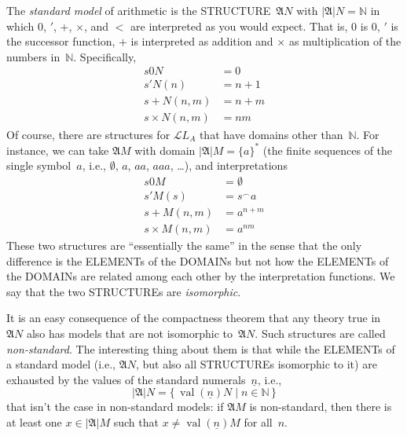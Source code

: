 \documentclass[10pt,a4paper]{article}
\newcommand*{\olup}[1]{\MakeUppercase{#1}}
\theoremstyle{plain}
\theoremstyle{definition}
\theoremstyle{remark}
\providecommand{\Obj}{}
\providecommand{\Struct}{\ensuremath{\mathfrak{A}}}
\providecommand{\Domain}{\ensuremath{|\mathfrak{A}|}}
\providecommand{\Assign}{\ensuremath{s}}
\providecommand{\Lang}{\ensuremath{\mathcal{L}}}
\providecommand{\num}[1]{\underline{#1}}
\providecommand{\Nat}{\ensuremath{\mathbb{N}}}
\providecommand{\concat}{\mathbin{{}^\frown}}
\providecommand{\Setabs}[2]{\{\, #1 \mid #2 \,\}}
\providecommand{\Value}[1]{\operatorname{val}(#1)}
\begin{document}
The \emph{standard model} of arithmetic is the
\olup{structure}~$\Struct{N}$ with $\Domain{N} = \Nat$ in which
$\Obj{0}$, $\prime$, $+$, $\times$, and $<$ are interpreted as you
would expect. That is, $\Obj{0}$ is $0$, $\prime$ is the successor
function, $+$ is interpreted as addition and $\times$ as multiplication
of the numbers in~$\Nat$. Specifically,
\begin{align*}
  \Assign{\Obj{0}}{N} & = 0\\
  \Assign{\prime}{N}(n) & = n + 1\\
  \Assign{+}{N}(n, m) & = n + m\\
  \Assign{\times}{N}(n, m) & = nm
\end{align*}
Of course, there are structures for $\Lang{L_A}$ that have domains
other than~$\Nat$. For instance, we can take $\Struct{M}$ with domain
$\Domain{M} = \{a\}^*$ (the finite sequences of the single
symbol~$a$, i.e., $\emptyset$, $a$, $aa$, $aaa$, \dots), and
interpretations
\begin{align*}
  \Assign{\Obj{0}}{M} & = \emptyset\\
  \Assign{\prime}{M}(s) & = s \concat a\\
  \Assign{+}{M}(n, m) & = a^{n + m}\\
  \Assign{\times}{M}(n, m) & = a^{nm}
\end{align*}
These two structures are ``essentially the same'' in the sense that
the only difference is the \olup{element}s of the \olup{domain}s but not how
the \olup{element}s of the \olup{domain}s are related among each other by
the interpretation functions. We say that the two \olup{structure}s are
\emph{isomorphic}.

It is an easy consequence of the compactness theorem that any theory
true in~$\Struct{N}$ also has models that are not isomorphic
to~$\Struct{N}$.  Such structures are called \emph{non-standard}.  The
interesting thing about them is that while the \olup{element}s of a
standard model (i.e., $\Struct{N}$, but also all \olup{structure}s
isomorphic to it) are exhausted by the values of the standard
numerals~$\num{n}$, i.e.,
\[
\Domain{N} = \Setabs{\Value{\num{n}}{N}}{n \in \Nat}
\]
that isn't the case in non-standard models: if $\Struct{M}$ is
non-standard, then there is at least one $x \in \Domain{M}$ such that
$x \neq \Value{\num{n}}{M}$ for all~$n$.
\end{document}
